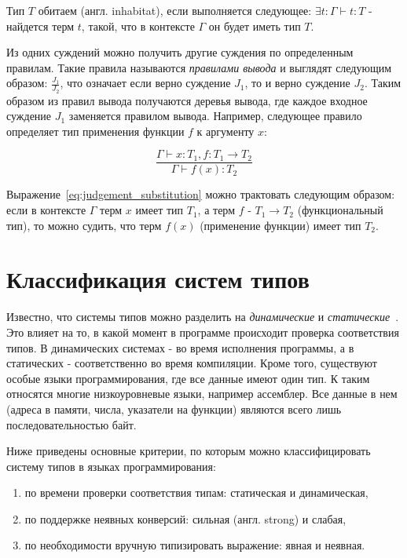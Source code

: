 Тип $T$ обитаем (англ. inhabitat), если выполняется следующее: $\exists t: \Gamma \vdash t: T$ - найдется терм $t$, такой, что в контексте $\Gamma$ он будет иметь тип $T$.

Из одних суждений можно получить другие суждения по определенным правилам.
Такие правила называются \textit{правилами вывода} и выглядят следующим образом: $\displaystyle \frac{J_1}{J_2}$, что означает если верно суждение $J_1$, то и верно суждение $J_2$.
Таким образом из правил вывода получаются деревья вывода, где каждое входное суждение $J_1$ заменяется правилом вывода.
Например, следующее правило определяет тип применения функции $f$ к аргументу $x$:

\begin{equation}
    \label{eq:judgement_substitution}
    \frac{\Gamma \vdash x: T_1, f: T_1 \to T_2}{\Gamma \vdash f(x): T_2}
\end{equation}

Выражение~\ref{eq:judgement_substitution} можно трактовать следующим образом: если в контексте $\Gamma$ терм $x$ имеет тип $T_1$, а терм $f$ - $T_1 \to T_2$ (функциональный тип), то можно судить, что терм $f(x)$ (применение функции) имеет тип $T_2$.



\section{Классификация систем типов}
\label{sec:classification}

Известно, что системы типов можно разделить на \textit{динамические} и \textit{статические}~\cite{Typing}.
Это влияет на то, в какой момент в программе происходит проверка соответствия типов.
В динамических системах - во время исполнения программы, а в статических - соответственно во время компиляции.
Кроме того, существуют особые языки программирования, где все данные имеют один тип.
К таким относятся многие низкоуровневые языки, например ассемблер.
Все данные в нем (адреса в памяти, числа, указатели на функции) являются всего лишь последовательностью байт.

Ниже приведены основные критерии, по которым можно классифицировать систему типов в языках программирования:

\begin{enumerate}[1)]
    \item по времени проверки соответствия типам: статическая и динамическая,
    \item по поддержке неявных конверсий: сильная (англ. strong) и слабая,
    \item по необходимости вручную типизировать выражение: явная и неявная.
\end{enumerate}

